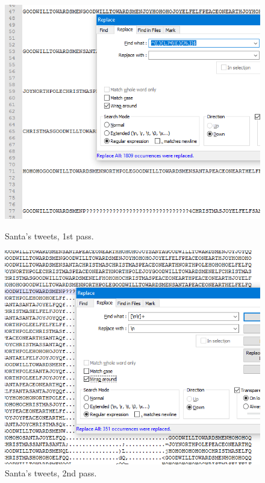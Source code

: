 \documentclass[writeup.tex]{subfiles}
\begin{document}
		\begin{figure}[H]
			\centering
			\begin{minipage}{.5\textwidth}
				\centering
				\includegraphics[width=0.9\linewidth]{screenshots/tweets_filtered_p1}
				\caption{Santa's tweets, 1st pass.}
				\label{fig.tweets_filtered_p1}
			\end{minipage}%
			\begin{minipage}{.5\textwidth}
				\centering
				\includegraphics[width=0.9\linewidth]{screenshots/tweets_filtered_p2}
				\caption{Santa's tweets, 2nd pass.}
				\label{fig.tweets_filtered_p2}
			\end{minipage}
		\end{figure}
		
\end{document}
